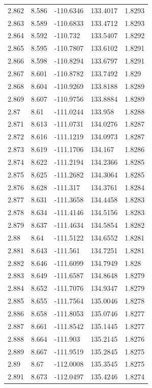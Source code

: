 \begin{tabular}{lllll}
2.862 & 8.586 & -110.6346 & 133.4017 & 1.8293 \\
2.863 & 8.589 & -110.6833 & 133.4712 & 1.8293 \\
2.864 & 8.592 & -110.732 & 133.5407 & 1.8292 \\
2.865 & 8.595 & -110.7807 & 133.6102 & 1.8291 \\
2.866 & 8.598 & -110.8294 & 133.6797 & 1.8291 \\
2.867 & 8.601 & -110.8782 & 133.7492 & 1.829 \\
2.868 & 8.604 & -110.9269 & 133.8188 & 1.8289 \\
2.869 & 8.607 & -110.9756 & 133.8884 & 1.8289 \\
2.87 & 8.61 & -111.0244 & 133.958 & 1.8288 \\
2.871 & 8.613 & -111.0731 & 134.0276 & 1.8287 \\
2.872 & 8.616 & -111.1219 & 134.0973 & 1.8287 \\
2.873 & 8.619 & -111.1706 & 134.167 & 1.8286 \\
2.874 & 8.622 & -111.2194 & 134.2366 & 1.8285 \\
2.875 & 8.625 & -111.2682 & 134.3064 & 1.8285 \\
2.876 & 8.628 & -111.317 & 134.3761 & 1.8284 \\
2.877 & 8.631 & -111.3658 & 134.4458 & 1.8283 \\
2.878 & 8.634 & -111.4146 & 134.5156 & 1.8283 \\
2.879 & 8.637 & -111.4634 & 134.5854 & 1.8282 \\
2.88 & 8.64 & -111.5122 & 134.6552 & 1.8281 \\
2.881 & 8.643 & -111.561 & 134.7251 & 1.8281 \\
2.882 & 8.646 & -111.6099 & 134.7949 & 1.828 \\
2.883 & 8.649 & -111.6587 & 134.8648 & 1.8279 \\
2.884 & 8.652 & -111.7076 & 134.9347 & 1.8279 \\
2.885 & 8.655 & -111.7564 & 135.0046 & 1.8278 \\
2.886 & 8.658 & -111.8053 & 135.0746 & 1.8277 \\
2.887 & 8.661 & -111.8542 & 135.1445 & 1.8277 \\
2.888 & 8.664 & -111.903 & 135.2145 & 1.8276 \\
2.889 & 8.667 & -111.9519 & 135.2845 & 1.8275 \\
2.89 & 8.67 & -112.0008 & 135.3545 & 1.8275 \\
2.891 & 8.673 & -112.0497 & 135.4246 & 1.8274 \\

\end{tabular}
